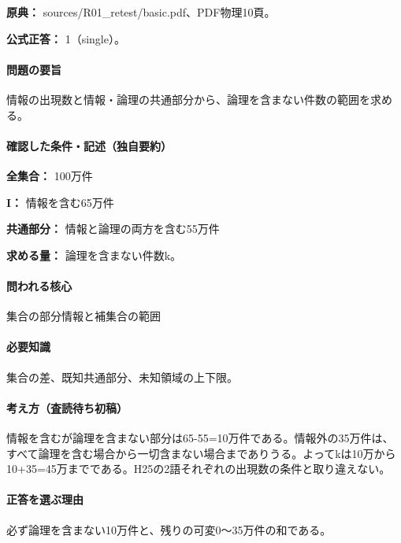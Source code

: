 \noindent\textbf{原典：} sources/R01\_retest/basic.pdf、PDF物理10頁。

\textbf{公式正答：} 1（single）。

\paragraph{問題の要旨} 情報の出現数と情報・論理の共通部分から、論理を含まない件数の範囲を求める。

\paragraph{確認した条件・記述（独自要約）}\mbox{}\par

\noindent\textbf{全集合：} 100万件\par

\noindent\textbf{I：} 情報を含む65万件\par

\noindent\textbf{共通部分：} 情報と論理の両方を含む55万件\par

\noindent\textbf{求める量：} 論理を含まない件数k。\par

\paragraph{問われる核心} 集合の部分情報と補集合の範囲

\paragraph{必要知識} 集合の差、既知共通部分、未知領域の上下限。

\paragraph{考え方（査読待ち初稿）} 情報を含むが論理を含まない部分は65-55=\allowbreak{}10万件である。情報外の35万件は、すべて論理を含む場合から一切含まない場合までありうる。よってkは10万から10+35=\allowbreak{}45万までである。H25の2語それぞれの出現数の条件と取り違えない。

\paragraph{正答を選ぶ理由} 必ず論理を含まない10万件と、残りの可変0〜35万件の和である。

